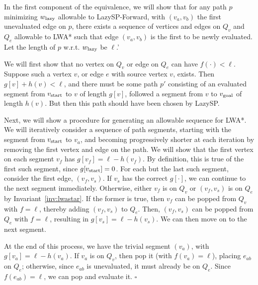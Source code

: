 \documentclass[nobib]{tufte-book}
\newcommand{\ms}[1]{\mbox{\scriptsize #1}}
\newenvironment{proof}[1][Proof]{\begin{trivlist}
   \item[\hskip \labelsep {\bfseries #1}]}{\hfill$\square$\end{trivlist}}
\begin{document}
\begin{proof}[Proof of Theorem \ref{thm:lwastar-equiv-from-lazy}]
In the first component of the equivalence,
we will show that for any path $p$ minimizing $w_{\ms{lazy}}$
allowable to LazySP-Forward,
with $(v_a, v_b)$ the first unevaluated edge on $p$,
there exists a sequence of vertices and edges on
$Q_v$ and $Q_e$ allowable to LWA*
such that edge $(v_a, v_b)$ is the first to be newly evaluated.
Let the length of $p$ w.r.t. $w_{\ms{lazy}}$ be $\ell$.'

We will first show that no vertex on $Q_v$ or edge on $Q_e$
can have $f(\cdot) < \ell$.
Suppose such a vertex $v$, or edge $e$ with source vertex $v$,
exists.
Then $g[v] + h(v) < \ell$,
and there must be some path $p'$ consisting of an evaluated segment
from $v_{\ms{start}}$ to $v$ of length $g[v]$,
followed a segment from $v$ to $v_{\ms{goal}}$ of length $h(v)$.
But then this path should have been chosen by LazySP.

Next, we will show a procedure for generating an allowable
sequence for LWA*.
We will iteratively consider a sequence of path segments,
starting with the segment from $v_{\ms{start}}$ to $v_a$,
and becoming progressively shorter at each iteration by removing the
first vertex and edge on the path.
We will show that the first vertex on each segment $v_f$
has $g[v_f] = \ell - h(v_f)$.
By definition,
this is true of the first such segment, since $g[v_{\ms{start}}] = 0$.
For each but the last such segment,
consider the first edge, $(v_f, v_s)$.
If $v_s$ has the correct $g[\cdot]$,
we can continue to the next segment immediately.
Otherwise,
either $v_f$ is on $Q_v$ or $(v_f, v_s)$ is on $Q_e$ by
Invariant~\ref{inv:lwastar}.
If the former is true,
then $v_f$ can be popped from $Q_v$ with $f = \ell$,
thereby adding $(v_f, v_s)$ to $Q_e$.
Then,
$(v_f, v_s)$ can be popped from $Q_e$ with $f = \ell$,
resulting in $g[v_s] = \ell - h(v_s)$.
We can then move on to the next segment.

At the end of this process,
we have the trivial segment $(v_a)$,
with $g[v_a] = \ell - h(v_a)$.
If $v_a$ is on $Q_v$, then pop it (with $f(v_a) = \ell$),
placing $e_{ab}$ on $Q_e$;
otherwise, since $e_{ab}$ is unevaluated,
it must already be on $Q_e$.
Since $f(e_{ab}) = \ell$, we can pop and evaluate it.
\end{proof}
\end{document}
